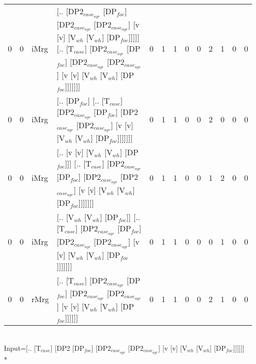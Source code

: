 \begin{tabularx}{\linewidth}{rrlXrrrrrrrrr}
   0 &   0 & iMrg & [.. [DP2$_{case_{agr}}$ [DP$_{foc}$] [DP2$_{case_{agr}}$ [DP2$_{case_{agr}}$] [v [v] [V$_{wh}$ [V$_{wh}$] [DP$_{foc}$]]]]] [.. [T$_{case}$] [DP2$_{case_{agr}}$ [DP$_{foc}$] [DP2$_{case_{agr}}$ [DP2$_{case_{agr}}$] [v [v] [V$_{wh}$ [V$_{wh}$] [DP$_{foc}$]]]]]]] &            0 &             1 &             1 &                  0 &              0 &            2 &             1 &              0 &            0 \\
   0 &   0 & iMrg & [.. [DP$_{foc}$] [.. [T$_{case}$] [DP2$_{case_{agr}}$ [DP$_{foc}$] [DP2$_{case_{agr}}$ [DP2$_{case_{agr}}$] [v [v] [V$_{wh}$ [V$_{wh}$] [DP$_{foc}$]]]]]]]                                                                             &            0 &             1 &             1 &                  0 &              0 &            2 &             0 &              0 &            0 \\
   0 &   0 & iMrg & [.. [v [v] [V$_{wh}$ [V$_{wh}$] [DP$_{foc}$]]] [.. [T$_{case}$] [DP2$_{case_{agr}}$ [DP$_{foc}$] [DP2$_{case_{agr}}$ [DP2$_{case_{agr}}$] [v [v] [V$_{wh}$ [V$_{wh}$] [DP$_{foc}$]]]]]]]                                                       &            0 &             1 &             1 &                  0 &              0 &            1 &             2 &              0 &            0 \\
   0 &   0 & iMrg & [.. [V$_{wh}$ [V$_{wh}$] [DP$_{foc}$]] [.. [T$_{case}$] [DP2$_{case_{agr}}$ [DP$_{foc}$] [DP2$_{case_{agr}}$ [DP2$_{case_{agr}}$] [v [v] [V$_{wh}$ [V$_{wh}$] [DP$_{foc}$]]]]]]]                                                               &            0 &             1 &             1 &                  0 &              0 &            0 &             1 &              0 &            0 \\
   0 &   0 & rMrg & [.. [T$_{case}$] [DP2$_{case_{agr}}$ [DP$_{foc}$] [DP2$_{case_{agr}}$ [DP2$_{case_{agr}}$] [v [v] [V$_{wh}$ [V$_{wh}$] [DP$_{foc}$]]]]]]                                                                                           &            0 &             1 &             1 &                  0 &              0 &            2 &             1 &              0 &            0 \\
\hline
\end{tabularx}\endgroup\\
\begingroup\scriptsize Input=[.. [T$_{case}$] [DP2 [DP$_{foc}$] [DP2$_{case_{agr}}$ [DP2$_{case_{agr}}$] [v [v] [V$_{wh}$ [V$_{wh}$] [DP$_{foc}$]]]]]]\\*
